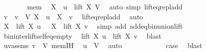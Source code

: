 \begin{isabellebody}
\ \ \ \ \ \ \isamarkupfalse%
\ mem\ \isamarkupfalse%
\ {\isachardoublequoteopen}X\ {\isacharplus}{\kern0pt}\ u\ {\isasymin}\ lift\ X\ V{\isachardoublequoteclose}\ \isamarkupfalse%
\ {\isacharparenleft}{\kern0pt}auto\ simp{\isacharcolon}{\kern0pt}\ lift{\isacharunderscore}{\kern0pt}eq{\isacharunderscore}{\kern0pt}repl{\isacharunderscore}{\kern0pt}add{\isacharparenright}{\kern0pt}\isanewline
\ \ \ \ \ \ \isamarkupfalse%
\ \isamarkupfalse%
\ v\ \ {\isachardoublequoteopen}v\ {\isasymin}\ V{\isachardoublequoteclose}\ {\isachardoublequoteopen}X\ {\isacharplus}{\kern0pt}\ u\ {\isacharequal}{\kern0pt}\ X\ {\isacharplus}{\kern0pt}\ v{\isachardoublequoteclose}\ \isamarkupfalse%
\ lift{\isacharunderscore}{\kern0pt}eq{\isacharunderscore}{\kern0pt}repl{\isacharunderscore}{\kern0pt}add\ \isamarkupfalse%
\ auto\isanewline
\ \ \ \ \ \ \isamarkupfalse%
\ \isamarkupfalse%
\ {\isachardoublequoteopen}X\ {\isasymunion}\ lift\ X\ u\ \ {\isacharequal}{\kern0pt}\ X\ {\isasymunion}\ lift\ X\ v{\isachardoublequoteclose}\ \isamarkupfalse%
\ {\isacharparenleft}{\kern0pt}simp\ add{\isacharcolon}{\kern0pt}\ add{\isacharunderscore}{\kern0pt}eq{\isacharunderscore}{\kern0pt}bin{\isacharunderscore}{\kern0pt}union{\isacharunderscore}{\kern0pt}lift{\isacharparenright}{\kern0pt}\isanewline
\ \ \ \ \ \ \isamarkupfalse%
\ bin{\isacharunderscore}{\kern0pt}inter{\isacharunderscore}{\kern0pt}lift{\isacharunderscore}{\kern0pt}self{\isacharunderscore}{\kern0pt}eq{\isacharunderscore}{\kern0pt}empty\ \isamarkupfalse%
\ {\isachardoublequoteopen}lift\ X\ u\ {\isacharequal}{\kern0pt}\ lift\ X\ v{\isachardoublequoteclose}\ \isamarkupfalse%
\ blast\isanewline
\ \ \ \ \ \ \isamarkupfalse%
\ uvassms\ {\isacartoucheopen}v\ {\isasymin}\ V{\isacartoucheclose}\ mem{\isachardot}{\kern0pt}IH\ \isamarkupfalse%
\ {\isachardoublequoteopen}u\ {\isasymin}\ V{\isachardoublequoteclose}\ \isamarkupfalse%
\ auto\isanewline
\ \ \ \ \isacommand{{\isacharbraceright}{\kern0pt}}\isamarkupfalse%
\isanewline
\ \ \ \ \isamarkupfalse%
\ \isamarkupfalse%
\ {\isacharquery}{\kern0pt}case\ \isamarkupfalse%
\ blast\isanewline
\ \ \isamarkupfalse%
\isanewline
{}\isamarkupfalse%
%
\endisatagproof
{\isafoldproof}%
%
\isadelimproof
\isanewline
%
\endisadelimproof
\isanewline
{}\isamarkupfalse%

\end{isabellebody}
